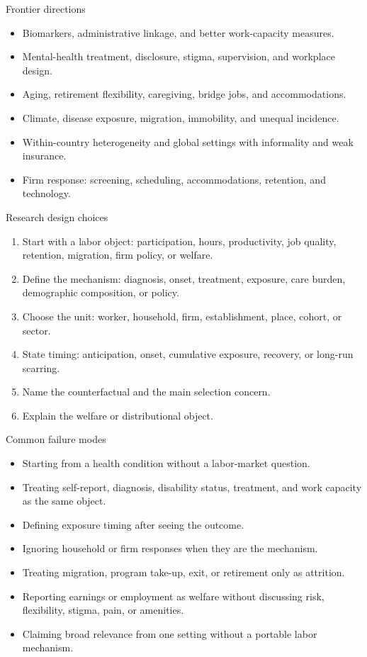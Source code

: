 \documentclass[aspectratio=169,11pt]{beamer}
\begin{document}
\begin{frame}{Frontier directions}
\begin{itemize}
    \item Biomarkers, administrative linkage, and better work-capacity measures.
    \item Mental-health treatment, disclosure, stigma, supervision, and workplace design.
    \item Aging, retirement flexibility, caregiving, bridge jobs, and accommodations.
    \item Climate, disease exposure, migration, immobility, and unequal incidence.
    \item Within-country heterogeneity and global settings with informality and weak insurance.
    \item Firm response: screening, scheduling, accommodations, retention, and technology.
\end{itemize}
\end{frame}

\begin{frame}{Research design choices}
\begin{enumerate}
    \item Start with a labor object: participation, hours, productivity, job quality, retention, migration, firm policy, or welfare.
    \item Define the mechanism: diagnosis, onset, treatment, exposure, care burden, demographic composition, or policy.
    \item Choose the unit: worker, household, firm, establishment, place, cohort, or sector.
    \item State timing: anticipation, onset, cumulative exposure, recovery, or long-run scarring.
    \item Name the counterfactual and the main selection concern.
    \item Explain the welfare or distributional object.
\end{enumerate}
\end{frame}

\begin{frame}{Common failure modes}
\begin{itemize}
    \item Starting from a health condition without a labor-market question.
    \item Treating self-report, diagnosis, disability status, treatment, and work capacity as the same object.
    \item Defining exposure timing after seeing the outcome.
    \item Ignoring household or firm responses when they are the mechanism.
    \item Treating migration, program take-up, exit, or retirement only as attrition.
    \item Reporting earnings or employment as welfare without discussing risk, flexibility, stigma, pain, or amenities.
    \item Claiming broad relevance from one setting without a portable labor mechanism.
\end{itemize}
\end{frame}
\end{document}
